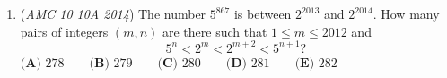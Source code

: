 \begin{enumerate}
 $\textbf{(A)}\ 996,506\qquad\textbf{(B)}\ 996,507\qquad\textbf{(C)}\ 996,508\qquad\textbf{(D)}\ 996,509\qquad\textbf{(E)}\ 996,510$


	\item (\textit{AMC 10 10A 2014}) The number $5^{867}$ is between $2^{2013}$ and $2^{2014}$.  How many pairs of integers $(m,n)$ are there such that $1\leq m\leq 2012$ and 
 \[5^n<2^m<2^{m+2}<5^{n+1}?\]
$\textbf{(A) }278\qquad\textbf{(B) }279\qquad\textbf{(C) }280\qquad\textbf{(D) }281\qquad\textbf{(E) }282\qquad$


\end{enumerate}